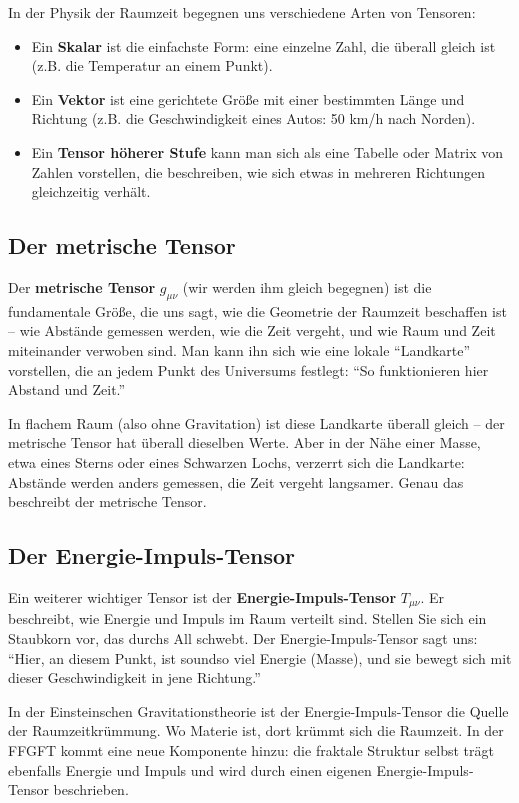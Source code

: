 In der Physik der Raumzeit begegnen uns verschiedene Arten von Tensoren:
\begin{itemize}[leftmargin=*]
\item Ein \textbf{Skalar} ist die einfachste Form: eine einzelne Zahl, die überall gleich ist (z.B. die Temperatur an einem Punkt).
\item Ein \textbf{Vektor} ist eine gerichtete Größe mit einer bestimmten Länge und Richtung (z.B. die Geschwindigkeit eines Autos: 50 km/h nach Norden).
\item Ein \textbf{Tensor höherer Stufe} kann man sich als eine Tabelle oder Matrix von Zahlen vorstellen, die beschreiben, wie sich etwas in mehreren Richtungen gleichzeitig verhält.
\end{itemize}

\subsection{Der metrische Tensor}

Der \textbf{metrische Tensor} $g_{\mu\nu}$ (wir werden ihm gleich begegnen) ist die fundamentale Größe, die uns sagt, wie die Geometrie der Raumzeit beschaffen ist – wie Abstände gemessen werden, wie die Zeit vergeht, und wie Raum und Zeit miteinander verwoben sind. Man kann ihn sich wie eine lokale \enquote{Landkarte} vorstellen, die an jedem Punkt des Universums festlegt: \enquote{So funktionieren hier Abstand und Zeit.}

In flachem Raum (also ohne Gravitation) ist diese Landkarte überall gleich – der metrische Tensor hat überall dieselben Werte. Aber in der Nähe einer Masse, etwa eines Sterns oder eines Schwarzen Lochs, verzerrt sich die Landkarte: Abstände werden anders gemessen, die Zeit vergeht langsamer. Genau das beschreibt der metrische Tensor.

\subsection{Der Energie-Impuls-Tensor}

Ein weiterer wichtiger Tensor ist der \textbf{Energie-Impuls-Tensor} $T_{\mu\nu}$. Er beschreibt, wie Energie und Impuls im Raum verteilt sind. Stellen Sie sich ein Staubkorn vor, das durchs All schwebt. Der Energie-Impuls-Tensor sagt uns: \enquote{Hier, an diesem Punkt, ist soundso viel Energie (Masse), und sie bewegt sich mit dieser Geschwindigkeit in jene Richtung.}

In der Einsteinschen Gravitationstheorie ist der Energie-Impuls-Tensor die Quelle der Raumzeitkrümmung. Wo Materie ist, dort krümmt sich die Raumzeit. In der FFGFT kommt eine neue Komponente hinzu: die fraktale Struktur selbst trägt ebenfalls Energie und Impuls und wird durch einen eigenen Energie-Impuls-Tensor beschrieben.

